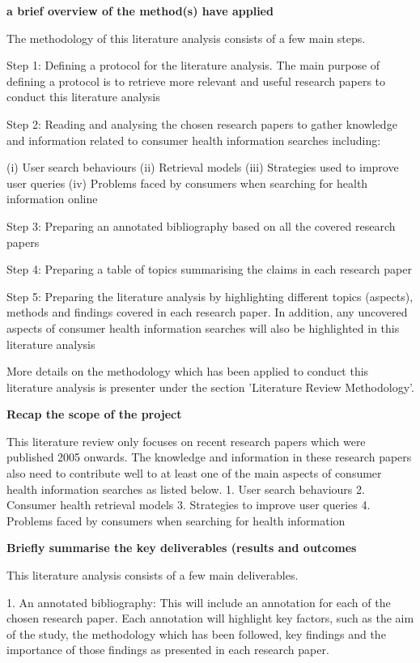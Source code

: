 \documentclass[]{article}
\begin{document}
\textbf{a brief overview of the method(s) have applied }

The methodology of this literature analysis consists of a few main steps.

Step 1: Defining a protocol for the literature analysis. The main purpose of defining a protocol is to retrieve more relevant and useful research papers to conduct this literature analysis 

Step 2: Reading and analysing the chosen research papers to gather knowledge and information related to consumer health information searches including:

(i)	User search behaviours
(ii) Retrieval models
(iii) Strategies used to improve user queries
(iv) Problems faced by consumers when searching for health information online

Step 3: Preparing an annotated bibliography based on all the covered research papers

Step 4: Preparing a table of topics summarising the claims in each research paper

Step 5: Preparing the literature analysis by highlighting different topics (aspects), methods and findings covered in each research paper. In addition, any uncovered aspects of consumer health information searches will also be highlighted in this literature analysis

More details on the methodology which has been applied to conduct this literature analysis is presenter under the section 'Literature Review Methodology'. 

\textbf{Recap the scope of the project}

This literature review only focuses on recent research papers which were published 2005 onwards. The knowledge and information in these research papers also need to contribute well to at least one of the main aspects of consumer health information searches as listed below.
1.	User search behaviours
2.	Consumer health retrieval models
3.	Strategies to improve user queries 
4.	Problems faced by consumers when searching for health information  

\textbf{Briefly summarise the key deliverables (results and outcomes}

This literature analysis consists of a few main deliverables.

1.	An annotated bibliography: This will include an annotation for each of the chosen research paper. Each annotation will highlight key factors, such as the aim of the study, the methodology which has been followed, key findings and the importance of those findings as presented in each research paper.  
\end{document}
